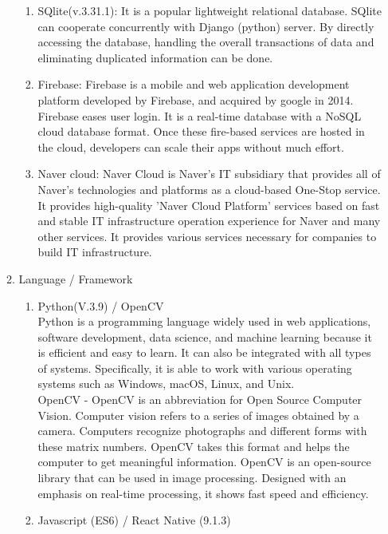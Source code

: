 \documentclass[conference]{IEEEtran}
\begin{document}
\begin{enumerate}[label=\arabic*.]
\begin{enumerate}[label=\alph*.]
\begin{enumerate}[label=\roman*.]
            \item {\large{SQlite(v.3.31.1): It is a popular lightweight relational database. SQlite can cooperate concurrently with Django (python) server. By directly accessing the database, handling the overall transactions of data and eliminating duplicated information can be done. }} \\
            \item {\large{Firebase: Firebase is a mobile and web application development platform developed by Firebase, and acquired by google in 2014. Firebase eases user login. It is a real-time database with a NoSQL cloud database format. Once these fire-based services are hosted in the cloud, developers can scale their apps without much effort. }} \\
            \item {\large{Naver cloud: Naver Cloud is Naver's IT subsidiary that provides all of Naver's technologies and platforms as a cloud-based One-Stop service. It provides high-quality 'Naver Cloud Platform' services based on fast and stable IT infrastructure operation experience for Naver and many other services. It provides various services necessary for companies to build IT infrastructure. }} \\
        \end{enumerate}
        \item {\large{Language / Framework}} \\
        \begin{enumerate}[label=\roman*.]
            \item {\large{Python(V.3.9) / OpenCV}} \\
            Python is a programming language widely used in web applications, software development, data science, and machine learning because it is efficient and easy to learn. It can also be integrated with all types of systems. Specifically, it is able to work with various operating systems such as Windows, macOS, Linux, and Unix. \\
            OpenCV - OpenCV is an abbreviation for Open Source Computer Vision. Computer vision refers to a series of images obtained by a camera. Computers recognize photographs and different forms with these matrix numbers. OpenCV takes this format and helps the computer to get meaningful information. OpenCV is an open-source library that can be used in image processing. Designed with an emphasis on real-time processing, it shows fast speed and efficiency. \\
            \item {\large{Javascript (ES6) / React Native (9.1.3)}} \\

\end{enumerate}
\end{enumerate}
\end{enumerate}
\end{document}
